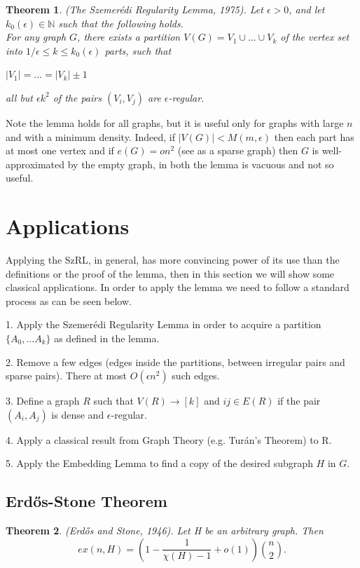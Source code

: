 \documentclass[12pt,twoside,a4paper]{book}
\numberwithin{equation}{section}
\newtheorem{theorem}             {Theorem}[section]
\theoremstyle{remark}
\begin{document}
\begin{theorem}
(The Szemerédi Regularity Lemma, 1975). Let $\epsilon > 0$, and let $k_0(\epsilon) \in  \mathbb{N}$ such that the following holds.\\
For any graph $G$, there exists a partition $V(G) = V_1 \cup ... \cup V_k$ of the vertex set into $1/ \epsilon \leq k \leq k_0 (\epsilon)$ parts, such that

$|V_1| = ... =|V_k| \pm 1$


all but $\epsilon k^2$ of the pairs $(V_i, V_j)$ are $\epsilon$-regular. 
\end{theorem}

Note the lemma holds for all graphs, but it is useful only for graphs with large $n$ and with a minimum density. Indeed, if $|V(G)| < M(m, \epsilon)$ then each part has at most one vertex and if $e(G) = on^2$ (see as a sparse graph) then $G$ is well-approximated by the empty graph, in both the lemma is vacuous and not so useful.  

\section{Applications}
Applying the SzRL, in general, has more convincing power of its use than the definitions or the proof of the lemma, then in this section we will show some classical applications. In order to apply the lemma we need to follow a standard process as can be seen below.

1. Apply the Szemerédi Regularity Lemma in order to acquire a partition $ \{ A_0, ... A_k \} $ as defined in the lemma.

2. Remove a few edges (edges inside the partitions, between irregular pairs and sparse pairs). There at most $O(\epsilon n^2)$ such edges.

3. Define a graph $R$ such that $V(R) \rightarrow [k]$ and $ij \in E(R) $ if  the pair $(A_i, A_j)$ is dense and $\epsilon$-regular.

4. Apply a classical result from Graph Theory (e.g. Turán's Theorem) to R.

5. Apply the Embedding Lemma to find a copy of the desired subgraph $H$ in $G$.
\subsection{Erd\H{o}s-Stone Theorem}

\begin{theorem}
(Erd\H{o}s and Stone, 1946). Let H be an arbitrary graph. Then
$$ ex(n,H) = \left(1-\frac{1}{\chi (H)-1} + o(1)\right) \binom{n}{2}.$$ 
\end{theorem}
\end{document}
